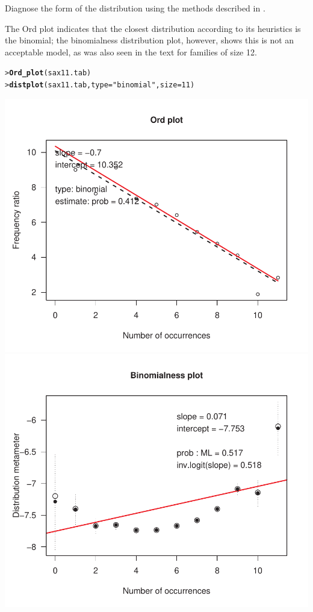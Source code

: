\documentclass[10pt]{report}\usepackage[]{graphicx}\usepackage[]{color}
\makeatletter
\newcommand{\hlnum}[1]{\textcolor[rgb]{0.686,0.059,0.569}{#1}}%
\newcommand{\hlstr}[1]{\textcolor[rgb]{0.192,0.494,0.8}{#1}}%
\newcommand{\hlstd}[1]{\textcolor[rgb]{0.345,0.345,0.345}{#1}}%
\newcommand{\hlkwc}[1]{\textcolor[rgb]{0.333,0.667,0.333}{#1}}%
\newcommand{\hlkwd}[1]{\textcolor[rgb]{0.737,0.353,0.396}{\textbf{#1}}}%
\newenvironment{kframe}{%
 \def\at@end@of@kframe{}%
 \ifinner\ifhmode%
  \def\at@end@of@kframe{\end{minipage}}%
  \begin{minipage}{\columnwidth}%
 \fi\fi%
 \def\FrameCommand##1{\hskip\@totalleftmargin \hskip-\fboxsep
 \colorbox{shadecolor}{##1}\hskip-\fboxsep
     \hskip-\linewidth \hskip-\@totalleftmargin \hskip\columnwidth}%
 \MakeFramed {\advance\hsize-\width
   \@totalleftmargin\z@ \linewidth\hsize
   \@setminipage}}%
 {\par\unskip\endMakeFramed%
 \at@end@of@kframe}
\newenvironment{knitrout}{}{} %
\renewenvironment{knitrout}{\small\renewcommand{\baselinestretch}{.85}}{} %
\makeatother
\begin{document}
\begin{Exercises}
\begin{enumerate*}
    \item Diagnose the form of the distribution using the methods described in .
    \begin{ans}
    The Ord plot indicates that the closest distribution according to its heuristics is the binomial;
    the binomialness distribution plot, however, shows this is not an acceptable model, as was also
    seen in the text for families of size 12.
\begin{knitrout}\footnotesize
{}\color{fgcolor}\begin{kframe}
\begin{alltt}
\hlstd{> }\hlkwd{Ord_plot}\hlstd{(sax11.tab)}
\hlstd{> }\hlkwd{distplot}\hlstd{(sax11.tab,} \hlkwc{type}\hlstd{=}\hlstr{"binomial"}\hlstd{,} \hlkwc{size}\hlstd{=}\hlnum{11}\hlstd{)}
\end{alltt}
\end{kframe}

\centerline{\includegraphics[width=.5\textwidth]{soln/fig/ex3_7c-1} 
\includegraphics[width=.5\textwidth]{soln/fig/ex3_7c-2} }



\end{knitrout}
    \end{ans}
    

\end{enumerate*}
\end{Exercises}
\end{document}
